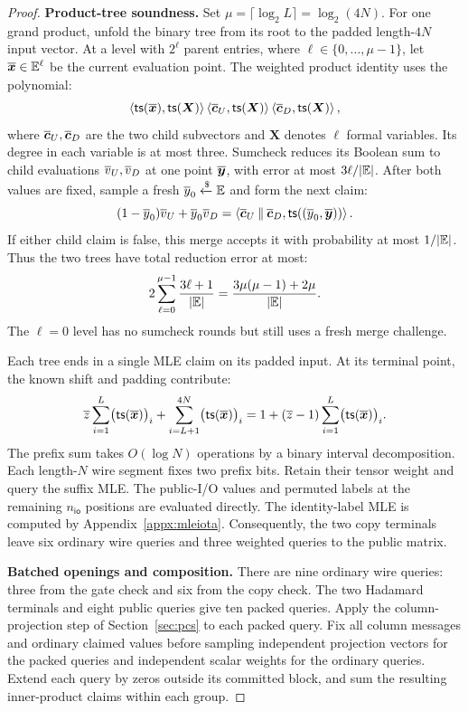 \begin{proof}
\smallskip\noindent\textbf{Product-tree soundness.}
Set \(\mu=\lceil\log_2L\rceil=\log_2(4N)\).
For one grand product, unfold the binary tree from its root
to the padded length-\(4N\) input vector.
At a level with \(2^\ell\) parent entries, where
\(\ell\in\{0,\ldots,\mu-1\}\), let
\(\overline{\bm x}\in\mathbb{E}^\ell\) be the current
evaluation point.
The weighted product identity uses the polynomial:
\[
    \left\langle
       {\sf ts}(\overline{\bm x}),{\sf ts}(\bm X)
    \right\rangle
    \left\langle\overline{\bm c}_U,{\sf ts}(\bm X)\right\rangle
    \left\langle\overline{\bm c}_D,{\sf ts}(\bm X)\right\rangle,
\]
where \(\overline{\bm c}_U,\overline{\bm c}_D\) are the two child subvectors
and \(\bm X\) denotes \(\ell\) formal variables.
Its degree in each variable is at most three.
Sumcheck reduces its Boolean sum to child evaluations
\(\overline{v}_U,\overline{v}_D\) at one point \(\overline{\bm y}\), with
error at most \(3\ell/|\mathbb{E}|\).
After both values are fixed, sample a fresh
\(\overline{y}_0\mathrel{\xleftarrow{\$}}\mathbb{E}\) and form the next claim:
\[
    (1-\overline{y}_0)\overline{v}_U+\overline{y}_0\overline{v}_D
       =
    \left\langle
       \overline{\bm c}_U\mathbin{\|}\overline{\bm c}_D,
       {\sf ts}((\overline{y}_0,\overline{\bm y}))
    \right\rangle.
\]
If either child claim is false, this merge accepts it with
probability at most \(1/|\mathbb{E}|\).
Thus the two trees have total reduction error at most:
\[
    2\sum_{\ell=0}^{\mu-1}\frac{3\ell+1}{|\mathbb{E}|}
       =\frac{3\mu(\mu-1)+2\mu}{|\mathbb{E}|}.
\]
The \(\ell=0\) level has no sumcheck rounds but still uses
a fresh merge challenge.

Each tree ends in a single MLE claim on its padded input.
At its terminal point, the known shift and padding contribute:
\[
    \overline{z}\sum_{i=1}^{L}
       \bigl({\sf ts}(\overline{\bm x})\bigr)_i
    +\sum_{i=L+1}^{4N}
       \bigl({\sf ts}(\overline{\bm x})\bigr)_i
    =
    1+(\overline{z}-1)\sum_{i=1}^{L}
       \bigl({\sf ts}(\overline{\bm x})\bigr)_i.
\]
The prefix sum takes \(O(\log N)\) operations by a binary
interval decomposition.
Each length-\(N\) wire segment fixes two prefix bits.
Retain their tensor weight and query the suffix MLE.
The public-I/O values and permuted labels at the remaining
\(n_{\mathsf{io}}\) positions are evaluated directly.
The identity-label MLE is computed by Appendix~\ref{appx:mleiota}.
Consequently, the two copy terminals leave six ordinary wire
queries and three weighted queries to the public matrix.

\smallskip\noindent\textbf{Batched openings and composition.}
There are nine ordinary wire queries: three from the gate check
and six from the copy check.
The two Hadamard terminals and eight public queries give
ten packed queries.
Apply the column-projection step of Section~\ref{sec:pcs}
to each packed query.
Fix all column messages and ordinary claimed values before
sampling independent projection vectors for the packed queries
and independent scalar weights for the ordinary queries.
Extend each query by zeros outside its committed block, and
sum the resulting inner-product claims within each group.


\end{proof}
